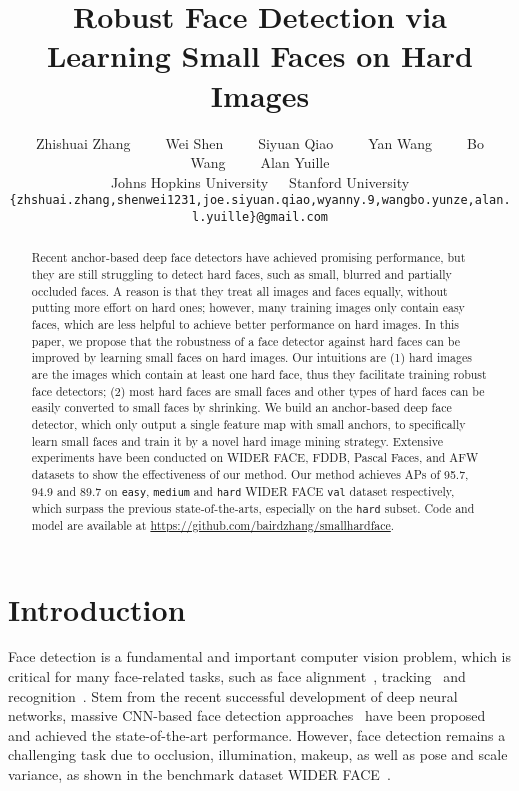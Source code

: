 \documentclass[10pt,twocolumn,letterpaper]{article}
\begin{document}
\title{Robust Face Detection via Learning Small Faces on Hard Images}

\author{Zhishuai Zhang~~~~~Wei Shen~~~~~Siyuan Qiao~~~~~Yan Wang~~~~~Bo Wang~~~~~Alan Yuille\\
Johns Hopkins University~~~Stanford University\\
{\tt\small \{zhshuai.zhang,shenwei1231,joe.siyuan.qiao,wyanny.9,wangbo.yunze,alan.l.yuille\}@gmail.com}
}

\maketitle


\begin{abstract}
Recent anchor-based deep face detectors have achieved promising performance, but they are still struggling to detect hard faces, such as small, blurred and partially occluded faces. A reason is that they treat all images and faces equally, without putting more effort on hard ones; however, many training images only contain easy faces, which are less helpful to achieve better performance on hard images. In this paper, we propose that the robustness of a face detector against hard faces can be improved by learning small faces on hard images. Our intuitions are (1) hard images are the images which contain at least one hard face, thus they facilitate training robust face detectors; (2) most hard faces are small faces and other types of hard faces can be easily converted to small faces by shrinking.
We build an anchor-based deep face detector, which only output a single feature map with small anchors, to specifically learn small faces and train it by a novel hard image mining strategy.
Extensive experiments have been conducted on WIDER FACE, FDDB, Pascal Faces, and AFW datasets
to show the effectiveness of our method.
Our method achieves APs of 95.7, 94.9 and 89.7 on \texttt{easy},
\texttt{medium} and \texttt{hard} WIDER FACE \texttt{val}
dataset respectively,
which surpass the previous state-of-the-arts, especially on the \texttt{hard} subset.
Code and model are available at \href{https://github.com/bairdzhang/smallhardface}{https://github.com/bairdzhang/smallhardface}.
\end{abstract}

\section{Introduction}
Face detection is a fundamental and important computer vision problem, which is critical for many face-related tasks, such as face alignment~\cite{cao2014face,xiong2013supervised}, tracking~\cite{kim2008face} and recognition~\cite{parkhi2015deep,schroff2015facenet}. Stem from the recent successful development of deep neural networks, massive CNN-based face detection approaches~\cite{hu2017finding,najibi2017ssh,Tang_2018_ECCV,zhang2017s,zhu2018seeing} have been
proposed and achieved the state-of-the-art performance. However, face detection remains a challenging task due to occlusion, illumination, makeup, as well as pose and scale variance, as shown in the benchmark dataset WIDER FACE~\cite{yang2016wider}.
\end{document}
